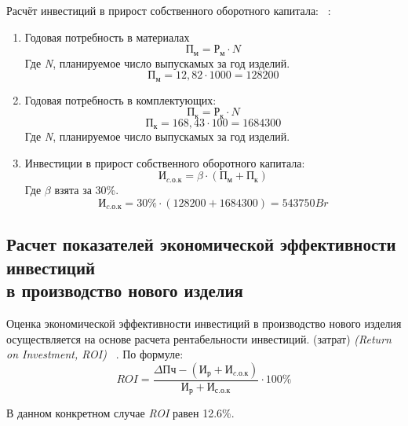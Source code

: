 Расчёт инвестиций в прирост собственного оборотного капитала:
~\cite{bsuir-project-economics}:
\begin{enumerate}
\item Годовая потребность в материалах
  \begin{equation}
    П_м = Р_м \cdot N
  \end{equation}
Где \textit{N}, планируемое число выпускамых за год изделий.
  $$  П_м = 12,82 \cdot 1000 = 128200$$
\item Годовая потребность в комплектующих:
  \begin{equation}
    П_к = Р_к \cdot N
  \end{equation}
  $$П_к = 168,43 \cdot 100 = 1684300$$
Где \textit{N}, планируемое число выпускамых за год изделий.

\item Инвестиции в прирост собственного оборотного капитала:
\begin{equation}
  И_{c.о.к} = \beta \cdot (П_м + П_к)
\end{equation}
Где $\beta$ взята за 30\%.
$$   И_{c.о.к} = 30\% \cdot (128200 + 1684300) = 543750Br$$
\end{enumerate}

\subsection{Расчет показателей экономической эффективности инвестиций \\
  в производство нового изделия}
 Оценка экономической эффективности инвестиций в производство нового
изделия осуществляется на основе расчета рентабельности инвестиций.
(затрат) \textit{(Return on Investment, ROI)} ~\cite{bsuir-project-economics}.
По формуле:
\begin{equation}
  ROI= \frac{\Delta Пч - (И_р + И_{c.о.к})}{И_р + И_{с.о.к}} \cdot 100 \%
\end{equation}


В данном конкретном случае \textit{ROI} равен 12.6\%.



\newpage

